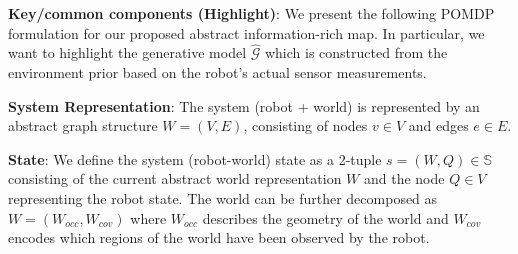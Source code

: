 \documentclass{article}
\newcommand{\ph}[1]{{\textbf{#1}:}} %
\begin{document}


\ph{Key/common components (Highlight)}
We present the following POMDP formulation for our proposed abstract information-rich map. In particular, we want to highlight the generative model $\hat{\mathcal{G}}$ which is constructed from the environment prior based on the robot's actual sensor measurements. 





\ph{System Representation} The system (robot + world) is represented by an abstract graph structure $W = (V, E)$, consisting of nodes $v \in V$ and edges $e \in E$.


\ph{State} We define the system (robot-world) state as a 2-tuple $s = (W, Q) \in \mathbb{S}$ consisting of the current abstract world representation $W$ and the node $Q \in V$ representing the robot state. The world can be further decomposed as $W = (W_{occ}, W_{cov})$ where $W_{occ}$ describes the geometry of the world and $W_{cov}$ encodes which regions of the world have been observed by the robot.   
\end{document}
